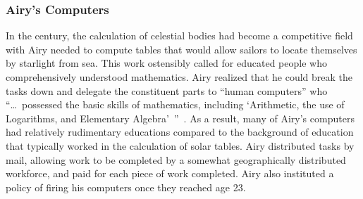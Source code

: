\documentclass[trackingWork]{subfiles}
\begin{document}
\subsubsection{Airy's Computers}
In the  century, the calculation of celestial bodies had become
a competitive field with 
Airy needed to compute tables that would
allow sailors to locate themselves by starlight from sea.
This work ostensibly called for educated people who comprehensively understood mathematics.
Airy realized that he could break the tasks down and delegate the constituent parts
to ``human computers'' who
``\dots~possessed the basic skills of mathematics,
including `Arithmetic, the use of Logarithms, and Elementary Algebra'~''~\cite{grier2013computers}.
As a result, many of Airy's computers had relatively rudimentary educations
compared to the background of education that typically worked in the calculation of solar tables.
Airy distributed tasks by mail,
allowing work to be completed by a somewhat geographically distributed workforce,
and paid for each piece of work completed.
Airy also instituted a policy of firing his computers once they reached age 23.










\onlyinsubfile{
  }
\end{document}
